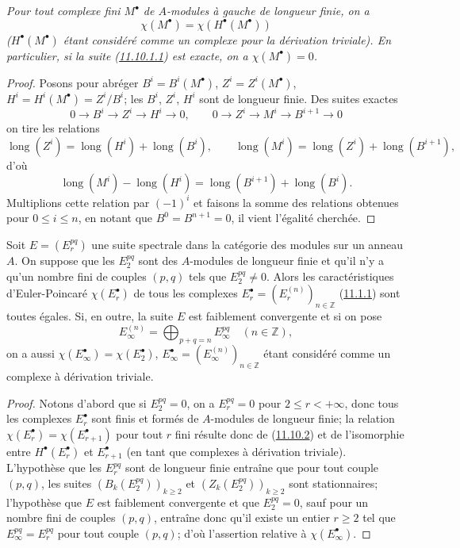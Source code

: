 \begin{proposition}[11.10.2]
\label{0.11.10.2-fr}
\emph{Pour tout complexe fini $M^\bullet$ de $A$-modules à gauche de longueur
finie, on a
\[
\chi(M^\bullet)=\chi(H^\bullet(M^\bullet))
\]
($H^\bullet(M^\bullet)$ étant considéré comme un complexe pour la dérivation
triviale). En particulier, si la suite
(\hyperref[0.11.10.1.1-fr]{11.10.1.1}) est exacte, on a
$\chi(M^\bullet)=0$.}
\end{proposition}

\begin{proof}
Posons pour abréger $B^i=B^i(M^\bullet)$, $Z^i=Z^i(M^\bullet)$,
$H^i=H^i(M^\bullet)=Z^i/B^i$; les $B^i$, $Z^i$, $H^i$ sont de longueur
finie. Des suites exactes
\[
0\longrightarrow B^i\longrightarrow Z^i\longrightarrow H^i
\longrightarrow0,
\qquad
0\longrightarrow Z^i\longrightarrow M^i\longrightarrow B^{i+1}
\longrightarrow0
\]
on tire les relations
\[
\operatorname{long}(Z^i)=\operatorname{long}(H^i)+
\operatorname{long}(B^i),
\qquad
\operatorname{long}(M^i)=\operatorname{long}(Z^i)+
\operatorname{long}(B^{i+1}),
\]
d'où
\[
\operatorname{long}(M^i)-\operatorname{long}(H^i)=
\operatorname{long}(B^{i+1})+\operatorname{long}(B^i).
\]
Multiplions cette relation par $(-1)^i$ et faisons la somme des relations
obtenues pour $0\leq i\leq n$, en notant que
$B^0=B^{n+1}=0$, il vient l'égalité cherchée.
\end{proof}

\begin{corollary}[11.10.3]
\label{0.11.10.3-fr}
Soit $E=(E_r^{pq})$ une suite spectrale dans la catégorie des modules sur un
anneau $A$. On suppose que les $E_2^{pq}$ sont des $A$-modules de longueur
finie et qu'il n'y a qu'un nombre fini de couples $(p,q)$ tels que
$E_2^{pq}\neq0$. Alors les caractéristiques d'Euler-Poincaré
$\chi(E_r^\bullet)$ de tous les complexes
$E_r^\bullet=(E_r^{(n)})_{n\in\mathbb Z}$
(\hyperref[0.11.1.1-fr]{11.1.1}) sont toutes égales. Si, en outre, la suite
$E$ est faiblement convergente et si on pose
\[
E_\infty^{(n)}=\bigoplus_{p+q=n}E_\infty^{pq}\quad(n\in\mathbb Z),
\]
on a aussi $\chi(E_\infty^\bullet)=\chi(E_2^\bullet)$,
$E_\infty^\bullet=(E_\infty^{(n)})_{n\in\mathbb Z}$ étant considéré comme
un complexe à dérivation triviale.
\end{corollary}

\begin{proof}
Notons d'abord que si $E_2^{pq}=0$, on a $E_r^{pq}=0$ pour
$2\leq r<+\infty$, donc tous les complexes $E_r^\bullet$ sont finis et
formés de $A$-modules de longueur finie; la relation
$\chi(E_r^\bullet)=\chi(E_{r+1}^\bullet)$ pour tout $r$ fini résulte donc de
(\hyperref[0.11.10.2-fr]{11.10.2}) et de l'isomorphie entre
$H^\bullet(E_r^\bullet)$ et $E_{r+1}^\bullet$ (en tant que complexes à
dérivation triviale). L'hypothèse que les $E_r^{pq}$ sont de longueur finie
entraîne que pour tout couple $(p,q)$, les suites
$(B_k(E_2^{pq}))_{k\geq2}$ et $(Z_k(E_2^{pq}))_{k\geq2}$ sont stationnaires;
l'hypothèse que $E$ est faiblement convergente et que $E_2^{pq}=0$, sauf
pour un nombre fini de couples $(p,q)$, entraîne donc qu'il existe un entier
$r\geq2$ tel que $E_\infty^{pq}=E_r^{pq}$ pour tout couple $(p,q)$; d'où
l'assertion relative à $\chi(E_\infty^\bullet)$.
\end{proof}

